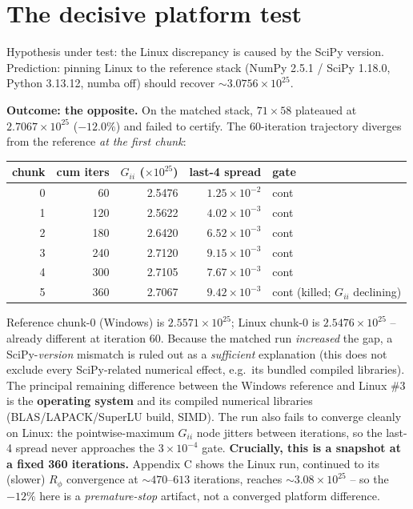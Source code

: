 \documentclass[11pt]{article}
\newcommand{\ten}[1]{\times 10^{#1}}
\begin{document}
\section{The decisive platform test}
Hypothesis under test: the Linux discrepancy is caused by the SciPy version. Prediction: pinning Linux to the reference stack (NumPy 2.5.1 / SciPy 1.18.0, Python 3.13.12, numba off) should recover $\sim3.0756\ten{25}$.

\textbf{Outcome: the opposite.} On the matched stack, $71\times58$ plateaued at $2.7067\ten{25}$ ($-12.0\%$) and failed to certify. The 60-iteration trajectory diverges from the reference \emph{at the first chunk}:
\begin{center}\small
\begin{tabular}{r r r r l}
\toprule
chunk & cum iters & $G_{ii}$ ($\ten{25}$) & last-4 spread & gate \\
\midrule
0 & 60  & 2.5476 & $1.25\ten{-2}$ & cont \\
1 & 120 & 2.5622 & $4.02\ten{-3}$ & cont \\
2 & 180 & 2.6420 & $6.52\ten{-3}$ & cont \\
3 & 240 & 2.7120 & $9.15\ten{-3}$ & cont \\
4 & 300 & 2.7105 & $7.67\ten{-3}$ & cont \\
5 & 360 & 2.7067 & $9.42\ten{-3}$ & cont (killed; $G_{ii}$ declining) \\
\bottomrule
\end{tabular}
\end{center}
Reference chunk-0 (Windows) is $2.5571\ten{25}$; Linux chunk-0 is $2.5476\ten{25}$ -- already different at iteration 60. Because the matched run \emph{increased} the gap, a SciPy-\emph{version} mismatch is ruled out as a \emph{sufficient} explanation (this does not exclude every SciPy-related numerical effect, e.g.\ its bundled compiled libraries). The principal remaining difference between the Windows reference and Linux \#3 is the \textbf{operating system} and its compiled numerical libraries (BLAS/LAPACK/SuperLU build, SIMD). The run also fails to converge cleanly on Linux: the pointwise-maximum $G_{ii}$ node jitters between iterations, so the last-4 spread never approaches the $3\ten{-4}$ gate. \textbf{Crucially, this is a snapshot at a fixed 360 iterations.} Appendix C shows the Linux run, continued to its (slower) $R_\phi$ convergence at $\sim\!470$--$613$ iterations, reaches $\sim3.08\ten{25}$ -- so the $-12\%$ here is a \emph{premature-stop} artifact, not a converged platform difference.
\end{document}
